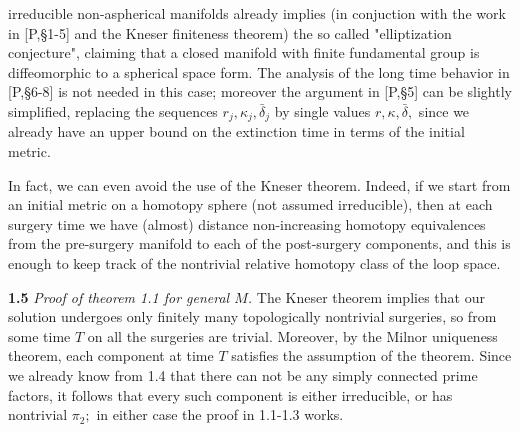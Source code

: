 \documentclass{article}
\begin{document}
irreducible non-aspherical manifolds already implies (in
conjuction with the work in [P,\S 1-5] and the Kneser finiteness
theorem) the so called "elliptization conjecture", claiming that a
closed manifold with finite fundamental group is diffeomorphic to
a spherical space form. The analysis of the long time behavior in
[P,\S 6-8] is not needed in this case; moreover the argument in
[P,\S 5] can be slightly simplified, replacing the sequences $r_j,
\kappa_j, \bar{\delta}_j$ by single values $r, \kappa,
\bar{\delta},$ since we already have an upper bound on the
extinction time in terms of the initial metric.
\par In fact, we can even avoid the use of the Kneser theorem.
Indeed, if we start from an initial metric on a homotopy sphere
(not assumed irreducible), then at each surgery time we have
(almost) distance non-increasing homotopy equivalences from the
pre-surgery manifold to each of the post-surgery components, and
this is enough to keep track of the nontrivial relative homotopy
class of the loop space.
\par {\bf 1.5} {\it Proof of theorem 1.1 for general $M$.}
The Kneser theorem implies that our solution undergoes only
finitely many topologically nontrivial surgeries, so from some
time $T$ on all the surgeries are trivial. Moreover, by the Milnor
uniqueness theorem, each component at time $T$ satisfies the
assumption of the theorem. Since we already know from 1.4 that
there can not be any simply connected prime factors, it follows
that every such component is either irreducible, or has nontrivial
$\pi_2;$ in either case the proof in 1.1-1.3 works.
\end{document}
